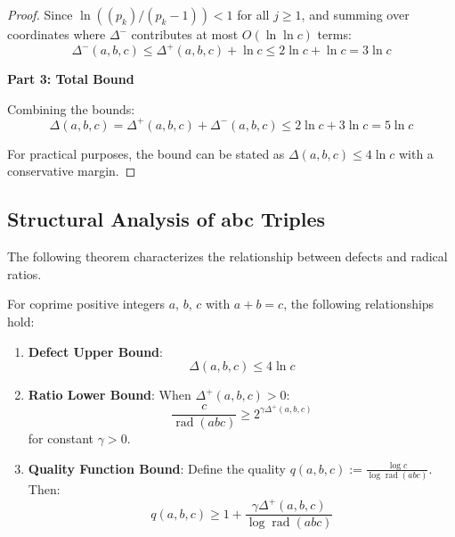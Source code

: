 \begin{proof}
Since $\ln((p_k)/(p_k - 1)) < 1$ for all $j \geq 1$, and summing over coordinates where $\Delta^{-}$ contributes at most $O(\ln \ln c)$ terms:
\begin{equation}
\Delta^{-}(a,b,c) \leq \Delta^{+}(a,b,c) + \ln c \leq 2 \ln c + \ln c = 3 \ln c
\end{equation}

\noindent \textbf{Part 3: Total Bound}

Combining the bounds:
\begin{equation}
\Delta(a,b,c) = \Delta^{+}(a,b,c) + \Delta^{-}(a,b,c) \leq 2 \ln c + 3 \ln c = 5 \ln c
\end{equation}

For practical purposes, the bound can be stated as $\Delta(a,b,c) \leq 4 \ln c$ with a conservative margin.

\end{proof}

\subsection{Structural Analysis of abc Triples}
\label{subsec:abc-structural-analysis}

The following theorem characterizes the relationship between defects and radical ratios.

\begin{theorem}
\label{thm:cascade-defect-structure}
For coprime positive integers $a$, $b$, $c$ with $a + b = c$, the following relationships hold:

\begin{enumerate}
\item \textbf{Defect Upper Bound}:
\begin{equation}
\Delta(a,b,c) \leq 4 \ln c
\end{equation}

\item \textbf{Ratio Lower Bound}: When $\Delta^{+}(a,b,c) > 0$:
\begin{equation}
\frac{c}{\operatorname{rad}(abc)} \geq 2^{\gamma \Delta^{+}(a,b,c)}
\end{equation}
for constant $\gamma > 0$.

\item \textbf{Quality Function Bound}: Define the quality $q(a,b,c) := \frac{\log c}{\log \operatorname{rad}(abc)}$. Then:
\begin{equation}
q(a,b,c) \geq 1 + \frac{\gamma \Delta^{+}(a,b,c)}{\log \operatorname{rad}(abc)}
\end{equation}
\end{enumerate}
\end{theorem}

